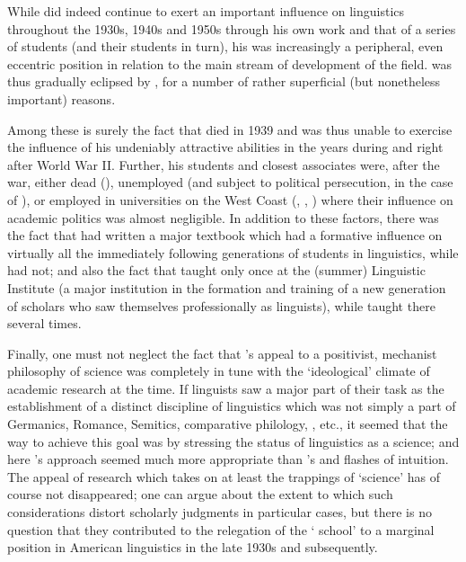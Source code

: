 While {\Sapir} did indeed continue to exert an important influence on
linguistics throughout the 1930s, 1940s and 1950s through his own work
and that of a series of students (and their students in turn), his was
increasingly a peripheral, even eccentric position in relation to the
main stream of development of the field. {\Sapir} was thus gradually
eclipsed by {\Bloomfield}, for a number of rather superficial (but
nonetheless important) reasons.

Among these is surely the fact that {\Sapir} died in 1939 and was thus
unable to exercise the influence of his undeniably attractive
abilities in the years during and right after World War II. Further,
his students and closest associates were, after the war, either dead
({\Whorf}), unemployed (and subject to political persecution, in the case
of {\Swadesh}), or employed in universities on the West Coast ({\Haas},
{\Hoijer}, {\Newman}) where their influence on academic politics was almost
negligible. In addition to these factors, there was the fact that
{\Bloomfield} had written a major textbook \citep{bloomfield:lg} which had a
formative influence on virtually all the immediately following
generations of students in linguistics, while {\Sapir} had not; and also
the fact that {\Sapir} taught only once at the (summer) Linguistic
Institute (a major institution in the formation and training of a new
generation of scholars who saw themselves professionally as
linguists), while {\Bloomfield} taught there several times.

Finally, one must not neglect the fact that {\Bloomfield}'s appeal to a
positivist, mechanist philosophy of science was completely in tune
with the `ideological' climate of academic research at the time. If
linguists saw a major part of their task as the establishment of a
distinct discipline of linguistics which was not simply a part of
Germanics, Romance, Semitics, comparative philology, ,
etc., it seemed that the way to achieve this goal was by stressing the
status of linguistics as a science; and here {\Bloomfield}'s approach
seemed much more appropriate than {\Sapir}'s  and flashes of
intuition. The appeal of research which takes on at least the
trappings of `science' has of course not disappeared; one can argue
about the extent to which such considerations distort scholarly
judgments in particular cases, but there is no question that they
contributed to the relegation of the `{\Sapir} school' to a marginal
position in American linguistics in the late 1930s and subsequently.

